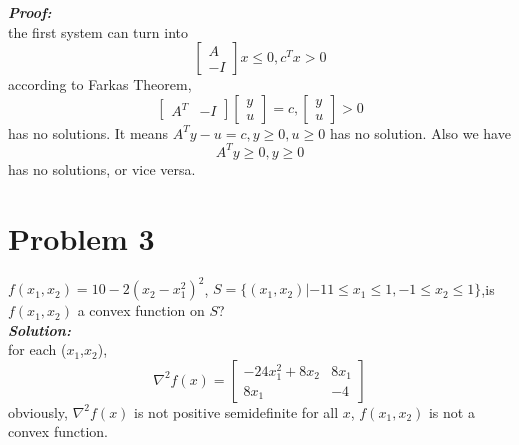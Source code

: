 \documentclass[paper=a4, fontsize=11pt]{scrartcl} %
\numberwithin{equation}{section} %
\numberwithin{figure}{section} %
\numberwithin{table}{section} %
\begin{document}
\emph{\textbf{Proof:}}\\
the first system can turn into
\begin{equation}
\begin{bmatrix}A \\ -I\end{bmatrix}x\leq0,c^Tx>0   \nonumber
\end{equation}
according to Farkas Theorem,
\begin{equation}
\begin{bmatrix}A^T & -I \end{bmatrix}\begin{bmatrix}y \\ u\end{bmatrix}=c, \begin{bmatrix}y \\ u\end{bmatrix}>0    \nonumber
\end{equation}
has no solutions. It means $A^Ty-u=c,y\geq0,u\geq0$ has no solution. Also we have
\begin{equation}
A^Ty\geq0,y\geq0 \nonumber
\end{equation}
has no solutions, or vice versa. 

\section{Problem 3}
$f(x_1,x_2)=10-2(x_2-x_1^2)^2$, $S=\{(x_1,x_2)|-11\leq x_1\leq1, -1\leq x_2\leq1\}$,is $f(x_1,x_2)$ a convex function on $S$?\\
\emph{\textbf{Solution:}}\\
for each ($x_1$,$x_2$),
\begin{equation}
\nabla^2f(x) = \begin{bmatrix} -24x_1^2+8x_2 & 8x_1 \\ 8x_1 &  -4 \end{bmatrix} \nonumber
\end{equation}
obviously, $\nabla^2f(x)$ is not positive semidefinite for all $x$, $f(x_1,x_2)$ is not a convex function.
\end{document}

